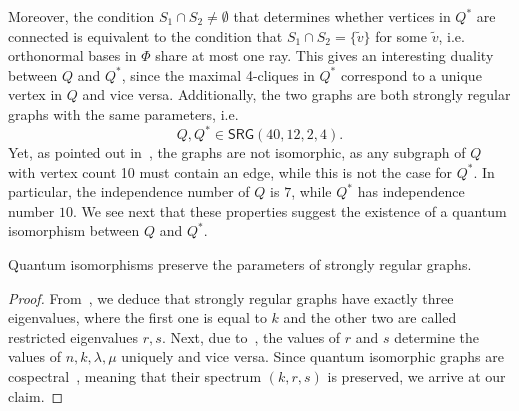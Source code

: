 Moreover, the condition $S_1 \cap S_2 \neq \emptyset$ that determines whether vertices in $Q^*$
are connected is equivalent to the condition that
$S_1 \cap S_2 = \{ \tilde{v} \}$ for some $\tilde{v}$, i.e. orthonormal bases in $\Phi$ share at most one ray.
This gives an interesting duality between $Q$ and $Q^*$,
since the maximal 4-cliques in $Q^*$ correspond to a unique vertex in $Q$ and vice versa.
Additionally, the two graphs are both strongly regular graphs with the same parameters,
i.e.
\[ Q, Q^* \in \textsf{SRG}(40, 12, 2, 4). \]
Yet, as pointed out in~\cite{ZIMBA1993697}, the graphs are not isomorphic,
as any subgraph of $Q$ with vertex count 10 must contain an edge, while this 
is not the case for $Q^*$.
In particular, the independence number of $Q$ is $7$, while $Q^*$ has independence number $10$.
%
We see next that these properties suggest the existence of a quantum isomorphism between $Q$ and $Q^*$.
\begin{lemma}
    Quantum isomorphisms preserve the parameters of strongly regular graphs.
\end{lemma}
\begin{proof}
    From~\cite[Theorem 9.1.2]{brouwer12}, we deduce that strongly regular graphs 
    have exactly three eigenvalues, where the first one is equal to $k$ and the other two are called 
    restricted eigenvalues $r, s$.
    Next, due to~\cite[Theorem 9.1.3]{brouwer12},
    the values of $r$ and $s$ determine the values of $n,k,\lambda,\mu$ uniquely and vice versa.
    Since quantum isomorphic graphs are cospectral~\cite{atserias2017quantumnonsignallinggraphisomorphisms},
    meaning that their spectrum $(k, r, s)$ is preserved, we arrive at our claim.
\end{proof}
